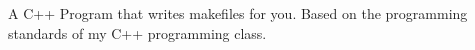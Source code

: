 A C++ Program that writes makefiles for you. Based on the programming standards of my C++ programming class. 